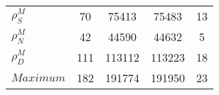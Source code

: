 \begin{center}
\begin{longtable}{lcccc}
$ {\rho^{M}_{S}}       $	 & 	                   70	 & 	                75413	 & 	                75483	 & 	                   13 \\ 
$ {\rho^{M}_{N}}       $	 & 	                   42	 & 	                44590	 & 	                44632	 & 	                    5 \\ 
$ {\rho^{M}_{D}}       $	 & 	                  111	 & 	               113112	 & 	               113223	 & 	                   18 \\ 
$Maximum               $	 & 	                  182	 & 	               191774	 & 	               191950	 & 	                   23 \\ 
\end{longtable}
 \end{center}
